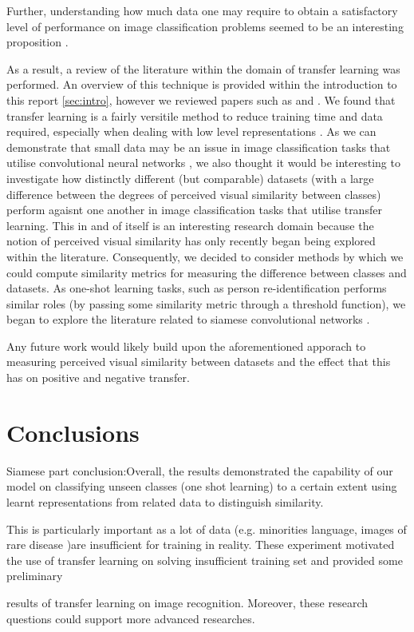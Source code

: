 \documentclass{article}
\begin{document}
Further, understanding how much data one may require to obtain a satisfactory level of performance on image classification problems seemed to be an interesting proposition \cite{howMuchData}.

As a result, a review of the literature within the domain of transfer learning was performed. An overview of this technique is provided within the introduction to this report \ref{sec:intro}, however we reviewed papers such as \cite{NIPS2014_5347} and \cite{oquab2014learning}. We found that transfer learning is a fairly versitile method to reduce training time and data required, especially when dealing with low level representations \cite{NIPS2014_5347}. As we can demonstrate that small data may be an issue in image classification tasks that utilise convolutional neural networks \cite{interim-report}, we also thought it would be interesting to investigate how distinctly different (but comparable) datasets (with a large difference between the degrees of perceived visual similarity between classes) perform agaisnt one another in image classification tasks that utilise transfer learning. This in and of itself is an interesting research domain because the notion of perceived visual similarity has only recently began being explored within the literature. Consequently, we decided to consider methods by which we could compute similarity metrics for measuring the difference between classes and datasets. As one-shot learning tasks, such as person re-identification \cite{ahmed2015improved} performs similar roles (by passing some similarity metric through a threshold function), we began to explore the literature related to siamese convolutional networks \cite{koch}.

Any future work would likely build upon the aforementioned apporach to measuring perceived visual similarity between datasets and the effect that this has on positive and negative transfer.

\section{Conclusions}
\label{sec:conclusions}

Siamese part conclusion:Overall, the results demonstrated the capability of our model on classifying unseen classes (one shot learning) to a certain extent using learnt representations from related data to distinguish similarity.

This is particularly important as a lot of data (e.g. minorities language, images of rare disease )are insufficient for training in reality. These experiment motivated the use of transfer learning on solving insufficient training set and provided some preliminary 

results of transfer learning on image recognition. Moreover, these research questions could support more advanced researches.

%

\end{document}
